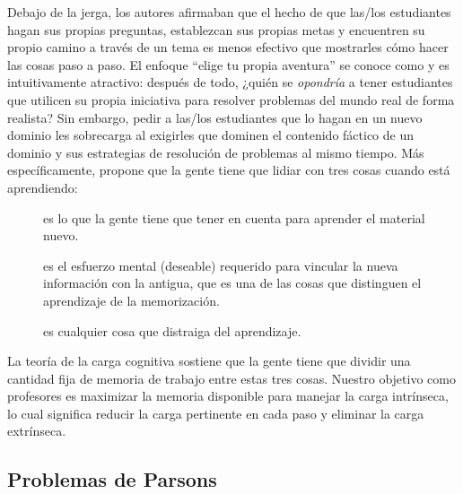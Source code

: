 Debajo de la jerga,
los autores afirmaban que el hecho de que las/los estudiantes hagan sus propias preguntas,
establezcan sus propias metas y
encuentren su propio camino a través de un tema es menos efectivo que mostrarles
cómo hacer las cosas paso a paso. El enfoque ``elige tu propia aventura'' se conoce como 
y es intuitivamente atractivo: después de todo,
¿quién se \emph{opondría} a tener estudiantes que utilicen su propia iniciativa
para resolver problemas del mundo real de forma realista?
Sin embargo, pedir a las/los estudiantes que lo hagan en un nuevo dominio les sobrecarga
al exigirles que dominen el contenido fáctico de un dominio y sus estrategias de resolución de problemas al mismo tiempo.
Más específicamente,
 propone que
la gente tiene que lidiar con tres cosas cuando está aprendiendo:


\begin{description}

\item[]
  es lo que la gente tiene que tener en cuenta para aprender el material nuevo.

\item[]
  es el esfuerzo mental (deseable) requerido para vincular la nueva información con la antigua,
  que es una de las cosas que distinguen el aprendizaje de la memorización.


\item[]
es cualquier cosa que distraiga del aprendizaje.

\end{description}

La teoría de la carga cognitiva sostiene que
la gente tiene que dividir una cantidad fija de memoria de trabajo entre estas tres cosas.
Nuestro objetivo como profesores es maximizar la memoria disponible para manejar la carga intrínseca,
lo cual significa reducir la carga pertinente en cada paso y eliminar la carga extrínseca.


\subsection*{Problemas de Parsons}

